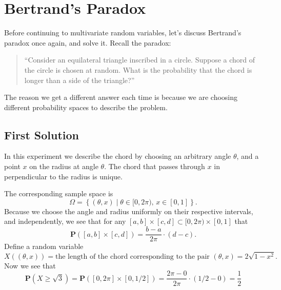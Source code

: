 \documentclass[11pt,a4paper]{article}
\theoremstyle{definition}
\theoremstyle{plain}
\newcommand{\Prob}{\mathbf{P}}
\newcommand{\set}[2]{ \left\{ #1 \mid #2 \right\} }
\begin{document}
  \newpage

  \section{Bertrand's Paradox}
  Before continuing to multivariate random variables, let's discuss Bertrand's
  paradox once again, and solve it. Recall the paradox:
  \begin{quote}
  ``Consider an equilateral triangle inscribed in a circle. 
    Suppose a chord of the circle is chosen at random. 
    What is the probability that the chord is longer than a side of the 
    triangle?''
  \end{quote}

  The reason we get a different answer
  each time is because we are choosing different probability
  spaces to describe the problem.
  \subsection{First Solution}
    In this experiment we describe the chord by choosing an arbitrary angle
    $\theta$, and a point $x$ on the radius at angle $\theta$. The chord
    that passes through $x$ in perpendicular to the radius is unique.
    \begin{center}
    \end{center}
    The corresponding sample space is
    \[
      \Omega = \set{(\theta, x)}{ \theta \in [0, 2 \pi),\, x \in [0,1]}.
    \]
    Because we choose the angle and radius uniformly on their respective
    intervals, and independently, we see that for any 
    $[a,b] \times [c,d] \subset [0, 2 \pi) \times [0,1]$ that
    \[
      \Prob([a,b] \times [c,d]) = \frac{b-a}{2 \pi} \cdot (d-c).
    \]
    Define a random variable
    \[
      X\left((\theta, x)\right) = \text{the length of the chord corresponding
      to the pair $(\theta, x)$} = 2 \sqrt{1 - x^2}.
    \]
    Now we see that
    \[
      \Prob\left(X \geq \sqrt{3}\right) = 
      \Prob([0,2 \pi] \times [0,1/2]) =
      \frac{2 \pi-0}{2 \pi} \cdot (1/2-0) =
      \frac{1}{2}
    \]
  
\end{document}
